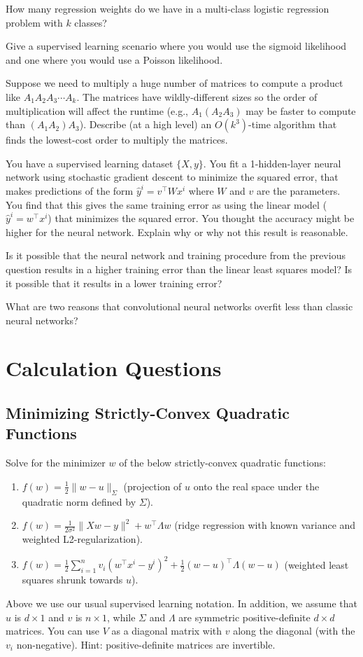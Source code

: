 \documentclass{article}
\def\blu#1{{\color{blu}#1}}
\def\norm#1{\|#1\|}
\def\enum#1{\begin{enumerate}#1\end{enumerate}}
\begin{document}
{{\item How many regression weights do we have in a multi-class logistic regression problem with $k$ classes?
\item Give a supervised learning scenario where you would use the sigmoid likelihood and one where you would use a Poisson likelihood.
\item Suppose we need to multiply a huge number of matrices to compute a product like $A_1 A_2A_3 \cdots A_k$. The matrices have wildly-different sizes so the order of multiplication will affect the runtime (e.g., $A_1(A_2A_3)$ may be faster to compute than $(A_1A_2)A_3$). Describe (at a high level) an $O(k^3)$-time algorithm that finds the lowest-cost order to multiply the matrices.
\item You have a supervised learning dataset $\{X,y\}$. You fit a 1-hidden-layer neural network using stochastic gradient descent to minimize the squared error, that makes predictions of the form $\hat{y}^i = v^\top Wx^i$ where $W$ and $v$ are the parameters. You find that this gives the same training error as using the linear model ($\hat{y}^i = w^\top x^i$) that minimizes the squared error. You thought the accuracy might be higher for the neural network. Explain why or why not this  result is reasonable.
\item Is it possible that the neural network and training procedure from the previous question results in a higher training error than the linear least squares model? Is it possible that it results in a lower training error?
\item What are two reasons that convolutional neural networks overfit less than classic neural networks?
}
}


\section{Calculation Questions}



\subsection{Minimizing Strictly-Convex Quadratic Functions}

Solve for the minimizer $w$ of the below strictly-convex quadratic functions:
\blu{\enum{
\item $f(w) = \frac{1}{2}\norm{w - u}_\Sigma$ (projection of $u$ onto the real space under the quadratic norm defined by $\Sigma$).
\item $f(w)= \frac{1}{2\sigma^2}\norm{Xw - y}^2 + w^\top \Lambda w$ (ridge regression with known variance and weighted L2-regularization).
\item $f(w) = \frac{1}{2}\sum_{i=1}^n v_i(w^\top x^i - y^i)^2 + \frac{1}{2}(w-u)^\top \Lambda(w-u)$ (weighted least squares shrunk towards $u$).
}}
Above we use our usual supervised learning notation. In addition, we assume that $u$ is $d \times 1$ and $v$ is $n \times 1$, while $\Sigma$ and $\Lambda$ are symmetric positive-definite $d \times d$ matrices. You can use $V$ as a diagonal matrix with $v$ along the diagonal (with the $v_i$ non-negative). Hint: positive-definite matrices are invertible.
\end{document}
